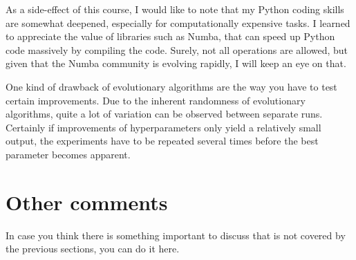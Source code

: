 \documentclass[a4paper,10pt]{article}
\newcommand{\ReplaceMe}[1]{{\color{blue}#1}}
\begin{document}
As a side-effect of this course, I would like to note that my Python coding skills are somewhat deepened, especially for computationally expensive tasks. I learned to appreciate the value of libraries such as Numba, that can speed up Python code massively by compiling the code. Surely, not all operations are allowed, but given that the Numba community is evolving rapidly, I will keep an eye on that.

One kind of drawback of evolutionary algorithms are the way you have to test certain improvements. Due to the inherent randomness of evolutionary algorithms, quite a lot of variation can be observed between separate runs. Certainly if improvements of hyperparameters only yield a relatively small output, the experiments have to be repeated several times before the best parameter becomes apparent.

\section{Other comments} \label{sec_other}

\ReplaceMe{In case you think there is something important to discuss that is not covered by the previous sections, you can do it here. }

 

\end{document}

